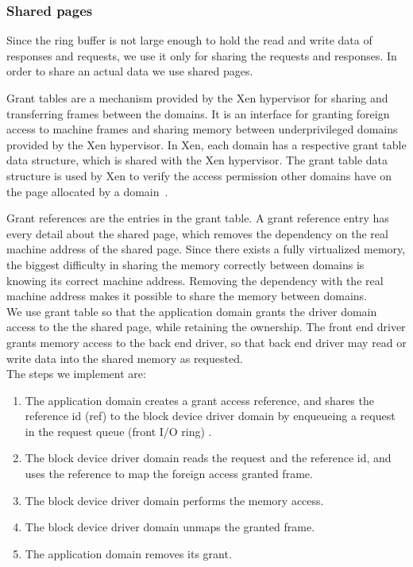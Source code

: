 \subsubsection*{Shared pages}
Since the ring buffer is not large enough to hold the read and write data of responses and requests, we use it only for sharing the requests and responses. In order to share an actual data we use shared pages. 

Grant tables are a mechanism provided by the Xen hypervisor for sharing and transferring frames between the domains. It is an interface for granting foreign access to machine frames and sharing memory between underprivileged domains provided by the Xen hypervisor. In Xen, each domain has a respective grant table data structure, which is shared with the Xen hypervisor. The grant table data structure is used by Xen to verify the access permission other domains have on the page allocated by a domain~\cite{granttable}.

Grant references are the entries in the grant table. A grant reference entry has every detail about the shared page, which removes the dependency on the real machine address of the shared page. Since there exists a fully virtualized memory, the biggest difficulty in sharing the memory correctly between domains is knowing its correct machine address. Removing the dependency with the real machine address makes it possible to share the memory between domains.\cite{Chisnall:2007:DGX:1407351, Barham:2003:XAV:945445.945462, granttable} 
\\
We use grant table so that the application domain grants the driver domain access to the the shared page, while retaining the ownership. The front end driver grants memory access to the back end driver, so that back end driver may read or write data into the shared memory as requested.
\\
The steps we implement are:
\begin{enumerate}
\item The application domain creates a grant access reference, and shares the reference id (ref) to the block device driver domain by enqueueing a request in the request queue (front I/O ring) .
\item The block device driver domain reads the request and the reference id, and uses the reference to map the foreign access granted frame.
\item The block device driver domain performs the memory access.
\item The block device driver domain unmaps the granted frame.
\item The application domain removes its grant.
\end{enumerate}

